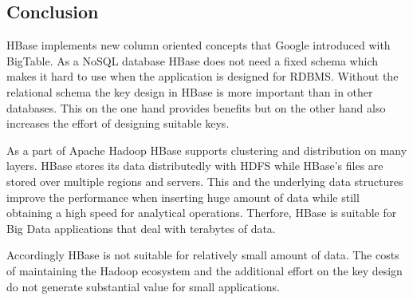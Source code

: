 
\subsection{Conclusion}
HBase implements new column oriented concepts that Google introduced with BigTable. As a NoSQL database HBase does not need a fixed schema which makes it hard to use when the application is designed for RDBMS. Without the relational schema the key design in HBase is more important than in other databases. This on the one hand provides benefits but on the other hand also increases the effort of designing suitable keys. 

As a part of Apache Hadoop HBase supports clustering and distribution on many layers. HBase stores its data distributedly with HDFS while HBase's files are stored over multiple regions and servers. This and the underlying data structures improve the performance when inserting huge amount of data while still obtaining a high speed for analytical operations. Therfore, HBase is suitable for Big Data applications that deal with terabytes of data. 

Accordingly HBase is not suitable for relatively small amount of data. The costs of maintaining the Hadoop ecosystem and the additional effort on the key design do not generate substantial value for small applications.

